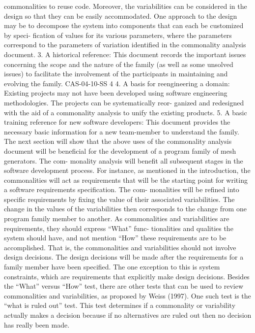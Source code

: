 \documentclass[12pt]{article}
\begin{document}
commonalities to reuse code. Moreover, the variabilities can be considered in the
design so that they can be easily accommodated. One approach to the design may
be to decompose the system into components that can each be customized by speci-
fication of values for its various parameters, where the parameters correspond to the
parameters of variation identified in the commonality analysis document.
3. A historical reference: This document records the important issues concerning the
scope and the nature of the family (as well as some unsolved issues) to facilitate the
involvement of the participants in maintaining and evolving the family.
CAS-04-10-SS
4
4. A basis for reengineering a domain: Existing projects may not have been developed
using software engineering methodologies. The projects can be systematically reor-
ganized and redesigned with the aid of a commonality analysis to unify the existing
products.
5. A basic training reference for new software developers: This document provides the
necessary basic information for a new team-member to understand the family.
The next section will show that the above uses of the commonality analysis document
will be beneficial for the development of a program family of mesh generators. The com-
monality analysis will benefit all subsequent stages in the software development process.
For instance, as mentioned in the introduction, the commonalities will act as requirements
that will be the starting point for writing a software requirements specification. The com-
monalities will be refined into specific requirements by fixing the value of their associated
variabilities. The change in the values of the variabilities then corresponds to the change
from one program family member to another.
As commonalities and variabilities are requirements, they should express “What” func-
tionalities and qualities the system should have, and not mention “How” these requirements
are to be accomplished. That is, the commonalities and variabilities should not involve
design decisions. The design decisions will be made after the requirements for a family
member have been specified. The one exception to this is system constraints, which are
requirements that explicitly make design decisions.
Besides the “What” versus “How” test, there are other tests that can be used to review
commonalities and variabilities, as proposed by Weiss (1997). One such test is the “what
is ruled out” test. This test determines if a commonality or variability actually makes a
decision because if no alternatives are ruled out then no decision has really been made.
\end{document}
